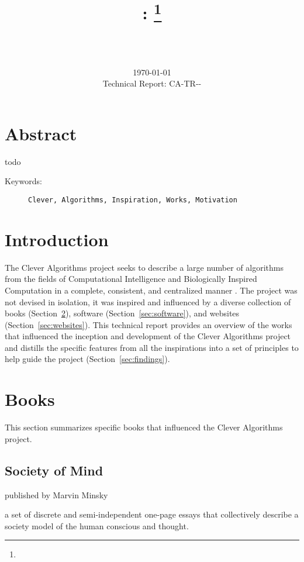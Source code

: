 \documentclass[a4paper, 11pt]{article}
\title{{\myreporttitle}: {\myreportsubtitle}\footnote{\myreportlicense}}
\author{\myreportauthor\\{\myreportemail}\\\small\myreportproject}
\date{\today\\{\small{Technical Report: CA-TR-{\myreportdate}-\myreportversion}}}
\begin{document}
\maketitle

\section*{Abstract} 
todo

\begin{description}
	\item[Keywords:] {\small\texttt{Clever, Algorithms, Inspiration, Works, Motivation}}
\end{description} 

\section{Introduction}
\label{sec:introduction}
The Clever Algorithms project seeks to describe a large number of algorithms from the fields of Computational Intelligence and Biologically Inspired Computation in a complete, consistent, and centralized manner \cite{Brownlee2010}. The project was not devised in isolation, it was inspired and influenced by a diverse collection of books (Section~\ref{sec:books}), software (Section~\ref{sec:software}), and websites (Section~\ref{sec:websites}). This technical report provides an overview of the works that influenced the inception and development of the Clever Algorithms project and distills the specific features from all the inspirations into a set of principles to help guide the project (Section~\ref{sec:findings}).

\section{Books}
\label{sec:books}
This section summarizes specific books that influenced the Clever Algorithms project.

% 
% 
\subsection{Society of Mind}
published by Marvin Minsky \cite{Minsky1988}

a set of discrete and semi-independent one-page essays that collectively describe a society model of the human conscious and thought.
\end{document}
